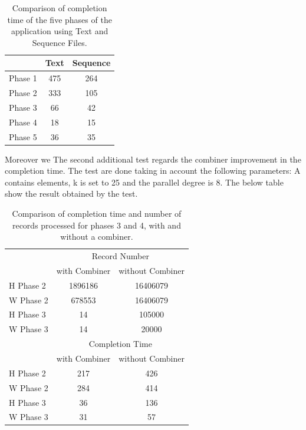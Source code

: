 \begin{table}
\begin{center}
\begin{tabular}{ | l || c | c | }
  \hline      
  & Text & Sequence \\
  \hline      
  Phase 1 & 475 & 264 \\
  Phase 2 & 333 & 105 \\
  Phase 3 & 66 & 42 \\ 
  Phase 4 & 18 & 15 \\
  Phase 5 & 36 & 35 \\
  \hline  
\end{tabular}
\end{center}
\label{tab:textvsSeq}
\caption{Comparison of completion time of the five phases of the application using Text and Sequence Files. }
\end{table}

Moreover we The second additional test regards the combiner improvement in the completion time. 
The test are done taking in account the following parameters: A contains  elements, k is set to 25 and the parallel degree is 8. The below table show the result obtained by the test.

\begin{table}[h!]
\begin{center}

\begin{tabular}{ | l || c | c | }
  \hline      
  & \multicolumn{2}{|c|}{Record Number} \\
  & with Combiner & without Combiner \\
  \hline      
  H Phase 2 & 1896186 & 16406079 \\
  W Phase 2 & 678553 & 16406079 \\ 
  H Phase 3 & 14 & 105000 \\ 
  W Phase 3 & 14 & 20000 \\ 
 \hline  
  \hline      
  & \multicolumn{2}{|c|}{Completion Time} \\
  & with Combiner & without Combiner \\
  \hline      
  H Phase 2 & 217 & 426 \\
  W Phase 2 & 284 & 414 \\ 
  H Phase 3 & 36 & 136 \\ 
  W Phase 3 & 31 & 57 \\ 
 \hline  
\end{tabular}

\end{center}
\caption{Comparison of completion time and number of records processed for phases 3 and 4, with and without a combiner.}
\label{comb_table}
\end{table}














